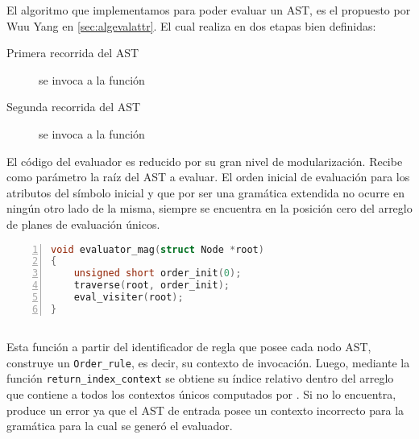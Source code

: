 El algoritmo que implementamos para poder evaluar un AST, es el propuesto por Wuu Yang en \ref{sec:algevalattr}. El cual realiza en dos etapas bien definidas:

\begin{description}
\item [Primera recorrida del AST] se invoca a la función

\item [Segunda recorrida del AST] se invoca a la función
\end{description}

El código del evaluador es reducido por su gran nivel de modularización. Recibe como parámetro la raíz del AST a evaluar. El orden inicial de evaluación para los atributos del símbolo inicial y que por ser una gramática extendida no ocurre en ningún otro lado de la misma, siempre se encuentra en la posición cero del arreglo de planes de evaluación únicos.

\vspace*{0.2cm}
\begin{lstlisting}[language=C++, basicstyle=\scriptsize, numbers=left, columns=fullflexible, linewidth=6cm]
void evaluator_mag(struct Node *root)
{
    unsigned short order_init(0);
    traverse(root, order_init);
    eval_visiter(root);
}
\end{lstlisting}
\vspace*{0.2cm}

\subsection*{}

Esta función a partir del identificador de regla que posee cada nodo AST, construye un \texttt{Order\_rule}, es decir, su contexto de invocación. Luego, mediante la función \texttt{return\_index\_context} se obtiene su índice relativo dentro del arreglo que contiene a todos los contextos únicos computados por \maggen. Si no lo encuentra, produce un error ya que el AST de entrada posee un contexto incorrecto para la gramática para la cual se generó el evaluador.

